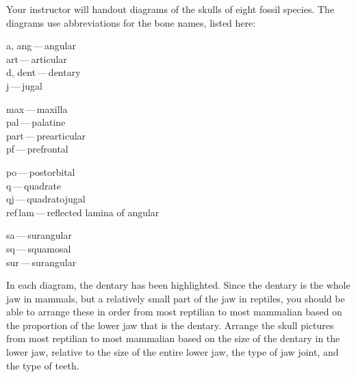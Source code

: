 \documentclass[12pt, hidelinks]{exam}
\begin{document}
\begin{questions}
Your instructor will handout diagrams of the skulls of eight fossil species. The diagrams use abbreviations for the bone names, listed here:

%

\begin{multicols}{4}
	a, ang\,---\,angular \\
	art\,---\,articular \\
	d, dent\,---\,dentary \\
	j\,---\,jugal 
	
	\columnbreak
	
	max\,---\,maxilla \\
	pal\,---\,palatine \\
	part\,---\,prearticular \\
	pf\,---\,prefrontal 

	\columnbreak
	
	po\,---\,postorbital \\
	q\,---\,quadrate \\
	qj\,---\,quadratojugal \\
	ref\,lam\,---\,reflected lamina of angular
	
	\columnbreak
	
	sa\,---\,surangular \\
	sq\,---\,squamosal \\
	sur\,---\,surangular
\end{multicols}

In each diagram, the dentary has been highlighted. Since the dentary is the whole jaw in mammals, but a relatively
small part of the jaw in reptiles, you should be able to arrange these
in order from most reptilian to most mammalian based on the proportion
of the lower jaw that is the dentary. Arrange the skull pictures from most reptilian to most mammalian based on the
size of the dentary in the lower jaw, relative to the size of the entire
lower jaw, the type of jaw joint, and the type of teeth.


\end{questions}
\end{document}
